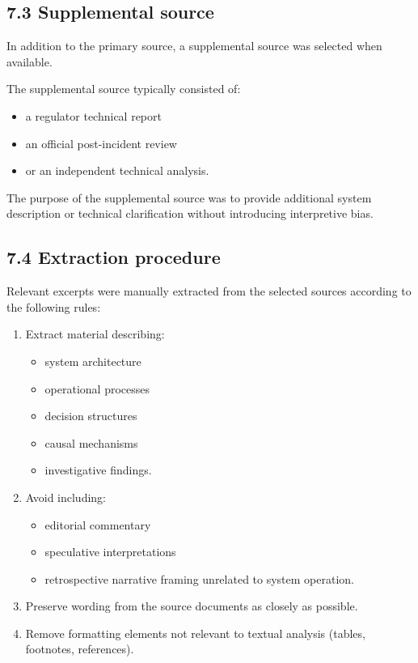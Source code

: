 {\subsection*{7.3 Supplemental source}

In addition to the primary source, a supplemental source was selected when available.

The supplemental source typically consisted of:

\begin{itemize}
\item a regulator technical report
\item an official post-incident review
\item or an independent technical analysis.
\end{itemize}

The purpose of the supplemental source was to provide additional system description or technical clarification without introducing interpretive bias.

\subsection*{7.4 Extraction procedure}

Relevant excerpts were manually extracted from the selected sources according to the following rules:

\begin{enumerate}
\item Extract material describing:
\begin{itemize}
\item system architecture
\item operational processes
\item decision structures
\item causal mechanisms
\item investigative findings.
\end{itemize}

\item Avoid including:
\begin{itemize}
\item editorial commentary
\item speculative interpretations
\item retrospective narrative framing unrelated to system operation.
\end{itemize}

\item Preserve wording from the source documents as closely as possible.
\item Remove formatting elements not relevant to textual analysis (tables, footnotes, references).
\end{enumerate}

}
